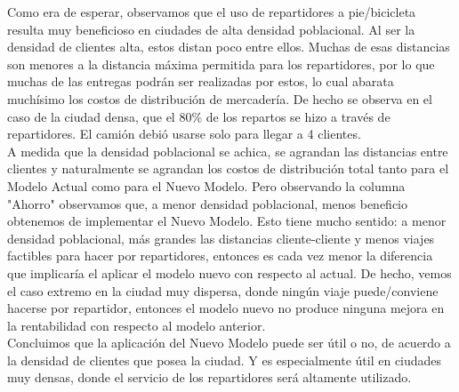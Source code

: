 \documentclass{article}
\begin{document}
    \begin{table}[H]
    \centering
    \caption{Comparación de costos entre metodologías para distintas densidades de clientes por $km^{2}$}
    \end{table}

    Como era de esperar, observamos que el uso de repartidores a pie/bicicleta resulta muy beneficioso en ciudades de alta densidad poblacional. Al ser la densidad de clientes alta, estos distan poco entre ellos. Muchas de esas distancias son menores a la distancia máxima permitida para los repartidores, por lo que muchas de las entregas podrán ser realizadas por estos, lo cual abarata muchísimo los costos de distribución de mercadería. De hecho se observa en el caso de la ciudad densa, que el 80\% de los repartos se hizo a través de repartidores. El camión debió usarse solo para llegar a 4 clientes. \\
    A medida que la densidad poblacional se achica, se agrandan las distancias entre clientes y naturalmente se agrandan los costos de distribución total tanto para el Modelo Actual como para el Nuevo Modelo. Pero observando la columna "Ahorro" observamos que, a menor densidad poblacional, menos beneficio obtenemos de implementar el Nuevo Modelo. Esto tiene mucho sentido: a menor densidad poblacional, más grandes las distancias cliente-cliente y menos viajes factibles para hacer por repartidores, entonces es cada vez menor la diferencia que implicaría el aplicar el modelo nuevo con respecto al actual. De hecho, vemos el caso extremo en la ciudad muy dispersa, donde ningún viaje puede/conviene hacerse por repartidor, entonces el modelo nuevo no produce ninguna mejora en la rentabilidad con respecto al modelo anterior. \\
    Concluimos que la aplicación del Nuevo Modelo puede ser útil o no, de acuerdo a la densidad de clientes que posea la ciudad. Y es especialmente útil en ciudades muy densas, donde el servicio de los repartidores será altamente utilizado.
\end{document}
